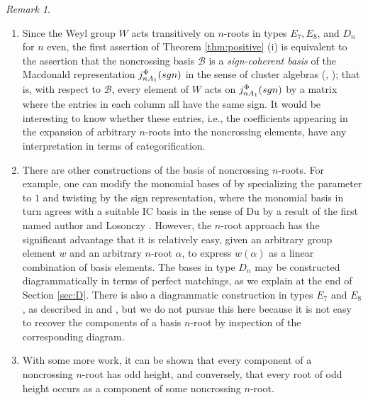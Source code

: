 \documentclass[11pt]{amsart}
\theoremstyle{plain}
\theoremstyle{definition}
\theoremstyle{remark}
\newtheorem{rmk}[theorem]{Remark}
\numberwithin{equation}{subsection}
\newcommand{\al}{\alpha}
\newcommand{\Be}{\mathcal B}
\newcommand{\macd}[2]{j^{#1}_{#2}({\rm{sgn}})}
\begin{document}
\begin{rmk}\label{rmk:othersimple}
\begin{enumerate}
\item[(i)]{Since the Weyl group $W$ acts transitively on $n$-roots in types
     $E_7, E_8$, and $D_n$ for $n$ even, the first assertion of Theorem
     \ref{thm:positive} (i) is equivalent to the assertion that the noncrossing
     basis $\Be$ is a \emph{sign-coherent basis} of the Macdonald representation
     $\macd{\Phi}{nA_1}$ in the sense of cluster algebras (\cite[Definition 2.2
     (i)]{cao19}, \cite[Definition 6.12]{fomin07}); that is, with respect to
     $\Be$, every element of $W$ acts on  $\macd{\Phi}{nA_1}$ by a matrix where
     the entries in each column all have the same sign. It would be interesting
     to know whether these entries, i.e., the coefficients appearing in the expansion
     of arbitrary $n$-roots into the noncrossing elements, have any
 interpretation in terms of categorification.}
\item[(ii)]{There are other constructions of the basis of noncrossing $n$-roots.  For
        example, one can modify the monomial bases of \cite{fan97} by
        specializing the parameter to $1$ and twisting by the sign
        representation, where the monomial basis in turn agrees with a suitable
        IC basis in the sense of Du \cite{Du} by a result of the first named
        author and Losonczy \cite[Theorem 3.6]{gl99}.
        However, the $n$-root approach has the significant advantage that it is
        relatively easy, given an arbitrary group element $w$ and an arbitrary
        $n$-root $\al$, to express $w(\al)$ as a linear combination of basis
        elements. The bases in type $D_n$ may be constructed diagrammatically in
        terms of perfect matchings, as we explain at the end of Section
        \ref{sec:D}. There is also a diagrammatic construction in types $E_7$
        and $E_8$, as described in \cite{tomdieck97} and \cite{green09}, but we
        do not pursue this here because it is not easy to recover the components
    of a basis $n$-root by inspection of the corresponding diagram.}
 \item[(iii)]{With some more work, it can be shown that every component of a
     noncrossing $n$-root has odd height, and conversely, that every root of odd
 height occurs as a component of some noncrossing $n$-root.}
\end{enumerate}
\end{rmk}
\end{document}
